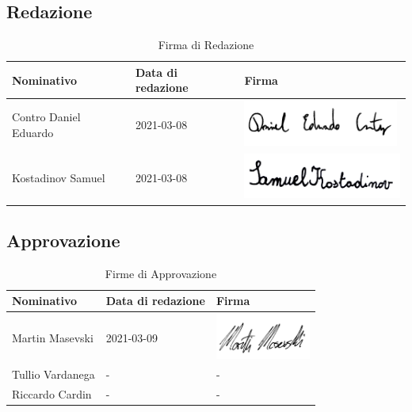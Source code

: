 \documentclass[../piano_di_progetto.tex]{subfiles}
\begin{document}
\subsection{Redazione}%
\label{sub:red}

\begin{table}[!ht]
	\centering
	\begin{tabular}{|l|l|l|}
		\hline
		\rowcolor{lightgray}
		\textbf{Nominativo} & \textbf{Data di redazione} & \textbf{Firma}\\ 
		\hline
			Contro Daniel Eduardo & 2021-03-08 & \includegraphics[height=1.5cm]{src/img/firme/firma_dec.png} \\
			Kostadinov Samuel & 2021-03-08 & \includegraphics[height=1.5cm]{src/img/firme/firma_sk.png} \\
		\hline
	\end{tabular}
	\caption{Firma di Redazione}
\end{table}


\subsection{Approvazione}%
\label{sub:app}

\begin{table}[!ht]
	\centering
	\begin{tabular}{|l|l|l|}
		\hline
		\rowcolor{lightgray}
		\textbf{Nominativo} & \textbf{Data di redazione} & \textbf{Firma} \\ 

		\hline
			Martin Masevski & 2021-03-09 & \includegraphics[height=1.5cm]{src/img/firme/firma_mm.png} \\ 
			Tullio Vardanega & - & - \\
			Riccardo Cardin  & - & - \\
		\hline
	\end{tabular}
		\caption{Firme di Approvazione}
\end{table}
\end{document}
